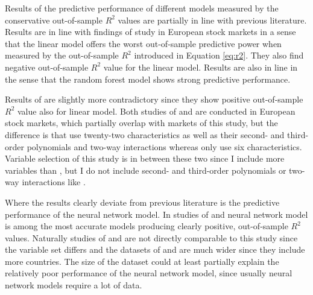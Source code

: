 \documentclass[12pt]{article}
\begin{document}
Results of the predictive performance of different models measured by the conservative out-of-sample $R^2$ values are partially in line with previous literature. Results are in line with findings of \citet{Drobetz} study in European stock markets in a sense that the linear model offers the worst out-of-sample predictive power when measured by the out-of-sample $R^2$ introduced in Equation \ref{eq:r2}. They also find negative out-of-sample $R^2$ value for the linear model. Results are also in line in the sense that the random forest model shows strong predictive performance.\footnotemark {} \par

Results of \citet{Fieberg} are slightly more contradictory since they show positive out-of-sample $R^2$ value also for linear model.\footnotemark {} Both studies of \citeauthor{Drobetz} and \citeauthor{Fieberg} are conducted in European stock markets, which partially overlap with markets of this study, but the difference is that \citeauthor{Drobetz} use twenty-two characteristics as well as their  second- and third-order polynomials and two-way interactions whereas \citeauthor{Fieberg} only use six characteristics. Variable selection of this study is in between these two since I include more variables than \citeauthor{Fieberg}, but I do not include second- and third-order polynomials or two-way interactions like \citeauthor{Drobetz}.\footnotemark {} \par

Where the results clearly deviate from previous literature is the predictive performance of the neural network model. In studies of \citet{Drobetz} and \citet{Fieberg} neural network model is among the most accurate models producing clearly positive, out-of-sample $R^2$ values.\footnotemark {} Naturally studies of \citeauthor{Drobetz} and \citeauthor{Fieberg} are not directly comparable to this study since the variable set differs and the datasets of  \citeauthor{Drobetz} and \citeauthor{Fieberg} are much wider since they include more countries. The size of the dataset could at least partially explain the relatively poor performance of the neural network model, since usually neural network models require a lot of data. \par
\end{document}

